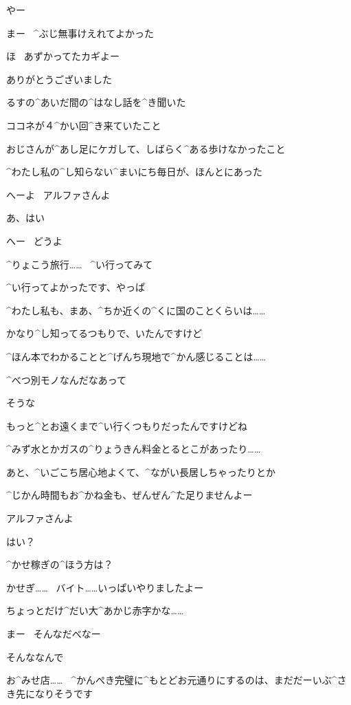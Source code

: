\Ojisan やー

\Ojisan まー
\ ^{ぶじ}{無事}けえれてよかった

\Ojisan ほ
\ あずかってたカギよー

\Alpha ありがとうございました

\page[58]
\Alpha るすの^{あいだ}{間}の^{はなし}{話}を^{き}{聞}いた

\Alpha ココネが４^{かい}{回}^{き}{来}ていたこと

\Alpha おじさんが^{あし}{足}にケガして、しばらく^{ある}{歩}けなかったこと

\Alpha ^{わたし}{私}の^{し}{知}らない^{まいにち}{毎日}が、ほんとにあった

\page[59]
\Ojisan へーよ
\ アルファさんよ

\Alpha あ、はい

\Ojisan へー
\ どうよ

\Ojisan ^{りょこう}{旅行}……
\ ^{い}{行}ってみて

\Alpha ^{い}{行}ってよかったです、やっぱ

\Alpha ^{わたし}{私}も、まあ、^{ちか}{近}くの^{くに}{国}のことくらいは……

\Alpha かなり^{し}{知}ってるつもりで、いたんですけど

\page[60]
\Alpha ^{ほん}{本}でわかることと^{げんち}{現地}で^{かん}{感}じることは……

\Alpha ^{べつ}{別}モノなんだなあって

\Ojisan そうな

\page[61]
\Alpha もっと^{とお}{遠}くまで^{い}{行}くつもりだったんですけどね

\Alpha ^{みず}{水}とかガスの^{りょうきん}{料金}とるとこがあったり……

\Alpha あと、^{いごこち}{居心地}よくて、^{ながい}{長居}しちゃったりとか

\Alpha ^{じかん}{時間}もお^{かね}{金}も、ぜんぜん^{た}{足}りませんよー

\page[62]
\Ojisan アルファさんよ

\Alpha はい？

\Ojisan ^{かせ}{稼}ぎの^{ほう}{方}は？

\Alpha かせぎ……
\ バイト……いっぱいやりましたよー

\Alpha ちょっとだけ^{だい}{大}^{あかじ}{赤字}かな……

\Ojisan まー
\ そんなだべなー

\page[63]
\Alpha そんななんで

\Alpha お^{みせ}{店}……
\ ^{かんぺき}{完璧}に^{もとどお}{元通}りにするのは、まだだーいぶ^{さき}{先}になりそうです

